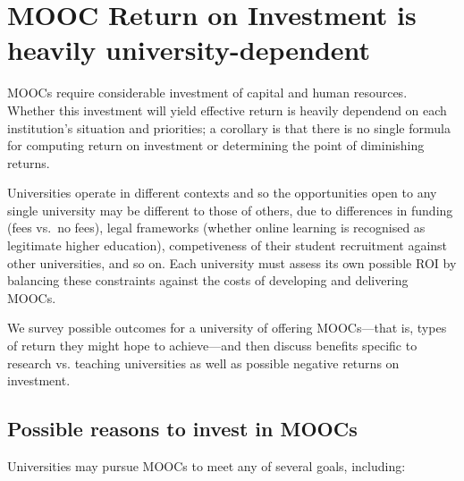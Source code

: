 \section{MOOC Return on Investment is heavily university-dependent}


MOOCs require considerable investment of capital and human resources.
Whether this investment will yield effective return is heavily dependend
on each institution's situation and priorities; a corollary is that
there is no single formula for computing return on investment or
determining the point of diminishing returns.

Universities operate in different contexts and so the opportunities open
to any single university may be different to those of others, due to
differences in funding (fees vs.\ no fees), legal frameworks (whether online
learning is recognised as legitimate higher education), competiveness of their
student recruitment against other universities, and so on.  Each
university must assess its own possible ROI by balancing these constraints
against the costs of developing and delivering MOOCs.
 
We survey possible outcomes for a university of offering MOOCs---that
is, types of return they might hope to achieve---and then discuss
benefits specific to research vs. teaching universities as well as
possible negative returns on investment.

\subsection{Possible reasons to invest in MOOCs}
 
Universities may pursue MOOCs to meet any of several goals, including:

